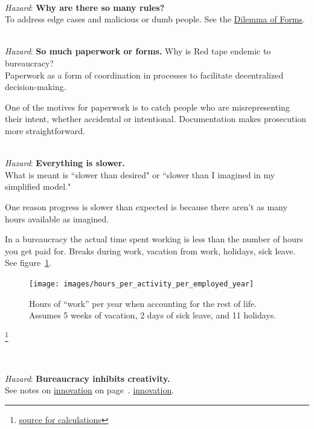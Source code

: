 \ \\
\textit{Hazard}: \textbf{Why are there so many rules?}\\
To address edge cases and malicious or dumb people. See the \hyperref[table:dilemma-subject-forms]{Dilemma of Forms}.

\ \\
\textit{Hazard}: \textbf{So much paperwork or forms.}
Why is Red tape endemic to bureaucracy?\\
Paperwork as a form of coordination in processes to facilitate decentralized decision-making. 

One of the motives for paperwork is to catch people who are misrepresenting their intent, whether accidental or intentional. Documentation makes prosecution more straightforward.

\ \\
\textit{Hazard}: \textbf{Everything is slower.}\\
What is meant is ``slower than desired" or ``slower than I imagined in my simplified model."

One reason progress is slower than expected is because there aren't as many hours available as imagined.



In a bureaucracy the actual time spent working is less than the number of hours you get paid for. Breaks during work, vacation from work, holidays, sick leave. See figure~\ref{fig:hours_per_year}.


\begin{figure}[H]
    \centering
    \texttt{[image: images/hours\_per\_activity\_per\_employed\_year]}
    \caption{Hours of ``work'' per year when accounting for the rest of life. Assumes 5 weeks of vacation, 2 days of sick leave, and 11 holidays.}
    \label{fig:hours_per_year}
\end{figure}


\footnote{\href{https://docs.google.com/spreadsheets/d/1ZaOZZXWkEzX4fFltUdlR4A6ENrAXnkzTW4YrjA4tDO8/edit?usp=sharing}{source for calculations}}

\ \\
\begin{samepage}
\textit{Hazard}: \textbf{Bureaucracy inhibits creativity.}\\
See 
notes on 
\ifhaspagenumbers
\hyperref[sec:innovation]{innovation} on page~\pageref{sec:innovation}.
\else
\hyperref[sec:innovation]{innovation}.
\fi
\end{samepage}

